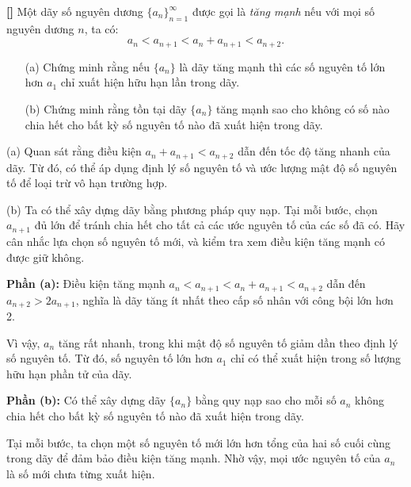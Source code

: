 \documentclass[../05-modular-arithmetic-a.tex]{subfiles}
\begin{document}
\begin{exercise*}\label{example:JPN-2015-MO-P3}\textbf{[]}
	Một dãy số nguyên dương \( \{a_n\}_{n=1}^{\infty} \) được gọi là \textit{tăng mạnh} nếu với mọi số nguyên dương \( n \), ta có:
	\[
		a_n < a_{n+1} < a_n + a_{n+1} < a_{n+2}.
	\]
	
	\begin{itemize}[topsep=0pt, partopsep=0pt, itemsep=0pt]
		\item[(a)] Chứng minh rằng nếu \( \{a_n\} \) là dãy tăng mạnh thì các số nguyên tố lớn hơn \( a_1 \) chỉ xuất hiện hữu hạn lần trong dãy.
		\item[(b)] Chứng minh rằng tồn tại dãy \( \{a_n\} \) tăng mạnh sao cho không có số nào chia hết cho bất kỳ số nguyên tố nào đã xuất hiện trong dãy.
	\end{itemize}
\end{exercise*}

\begin{remark*}
    (a) Quan sát rằng điều kiện \( a_n + a_{n+1} < a_{n+2} \) dẫn đến tốc độ tăng nhanh của dãy.
    Từ đó, có thể áp dụng định lý số nguyên tố và ước lượng mật độ số nguyên tố để loại trừ vô hạn trường hợp.

    (b) Ta có thể xây dựng dãy bằng phương pháp quy nạp. Tại mỗi bước, chọn \( a_{n+1} \) đủ lớn để tránh chia hết cho tất cả các ước nguyên tố của các số đã có.
    Hãy cân nhắc lựa chọn số nguyên tố mới, và kiểm tra xem điều kiện tăng mạnh có được giữ không.
\end{remark*}

\begin{story*}
	\textbf{Phần (a):} Điều kiện tăng mạnh \( a_n < a_{n+1} < a_n + a_{n+1} < a_{n+2} \) dẫn đến \( a_{n+2} > 2a_{n+1} \), nghĩa là dãy tăng ít nhất theo cấp số nhân với công bội lớn hơn 2.

	Vì vậy, \( a_n \) tăng rất nhanh, trong khi mật độ số nguyên tố giảm dần theo định lý số nguyên tố. Từ đó, số nguyên tố lớn hơn \( a_1 \) chỉ có thể xuất hiện trong số lượng hữu hạn phần tử của dãy.

	\textbf{Phần (b):} Có thể xây dựng dãy \( \{a_n\} \) bằng quy nạp sao cho mỗi số \( a_n \) không chia hết cho bất kỳ số nguyên tố nào đã xuất hiện trong dãy.

	Tại mỗi bước, ta chọn một số nguyên tố mới lớn hơn tổng của hai số cuối cùng trong dãy để đảm bảo điều kiện tăng mạnh. Nhờ vậy, mọi ước nguyên tố của \( a_n \) là số mới chưa từng xuất hiện.
\end{story*}
\end{document}
